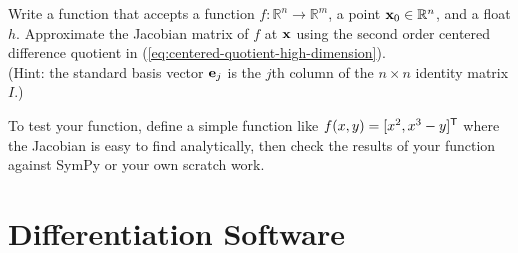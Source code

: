 \begin{problem}
Write a function that accepts a function $f:\mathbb{R}^n\rightarrow\mathbb{R}^m$, a point $\mathbf{x}_0 \in \mathbb{R}^n$, and a float $h$.
Approximate the Jacobian matrix of $f$ at $\mathbf{x}$ using the second order centered difference quotient in (\ref{eq:centered-quotient-high-dimension}).
\\(Hint: the standard basis vector $\mathbf{e}_j$ is the $j$th column of the $n\times n$ identity matrix $I$.)

To test your function, define a simple function like $f(x,y) = [x^2, x^3 - y]^{\mathsf T}$ where the Jacobian is easy to find analytically, then check the results of your function against SymPy or your own scratch work.
\label{prob:jac_center}
\end{problem}

\section*{Differentiation Software} %

